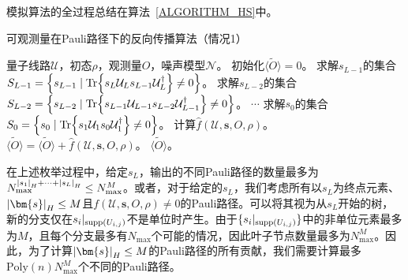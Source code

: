 模拟算法的全过程总结在算法~\ref{ALGORITHM_HS}中。
\begin{algorithm}[H]
    \caption{可观测量在Pauli路径下的反向传播算法（情况1）}
    \label{ALGORITHM_HS}
    \begin{algorithmic}[1]
        \REQUIRE 量子线路$\mathcal{U}$，初态$\rho$，观测量$O$，噪声模型$\mathcal{N}$。
        \STATE 初始化$\widetilde{\langle O \rangle}=0$。
            \STATE 求解$s_{L-1}$的集合$S_{L-1}=\left\{s_{L-1}\mid \Tr{s_L \mathcal{U}_L s_{L-1} \mathcal{U}_L^\dagger}\neq 0\right\}$。
                    \STATE 求解$s_{L-2}$的集合$S_{L-2}=\left\{s_{L-2}\mid \Tr{s_{L-1} \mathcal{U}_{L-1} s_{L-2} \mathcal{U}_{L-1}^\dagger}\neq 0\right\}$。
                            \STATE $\cdots$
                            \STATE 求解$s_{0}$的集合$S_{0}=\left\{s_{0}\mid \Tr{s_{1} \mathcal{U}_{1} s_{0} \mathcal{U}_{1}^\dagger}\neq 0\right\}$。
                                    \STATE 计算$\hat{f}(\mathcal{U},\bm{s},O,\rho)$。
                                    \STATE $\widetilde{\langle O \rangle}=\widetilde{\langle O \rangle}+\hat{f}(\mathcal{U},\bm{s},O,\rho)$。
                                \ENDIF
                            \ENDFOR
                        \ENDIF
                    \ENDFOR
                \ENDIF
            \ENDFOR
        \ENDFOR
        \RETURN $\widetilde{\langle O \rangle}$。
    \end{algorithmic}
\end{algorithm}

在上述枚举过程中，给定$s_L$，输出的不同Pauli路径的数量最多为$N_{\text{max}}^{\abs{s_1}_H+\cdots+\abs{s_L}_H}\leq N_{\text{max}}^{M}$。或者，对于给定的$s_L$，我们考虑所有以$s_L$为终点元素、$\abs{\bm{s}}_H\leq M$且$f(\mathcal{U},\bm{s},O,\rho)\neq 0$的Pauli路径。可以将其视为从$s_L$开始的树，新的分支仅在$s_{i}|_{\text{supp}(U_{i,j})}$不是单位时产生。由于$\{s_{i}|_{\text{supp}(U_{i,j})}\}$中的非单位元素最多为$M$，且每个分支最多有$N_{\text{max}}$个可能的情况，因此叶子节点数量最多为$N_{\text{max}}^{M}$。因此，为了计算$\abs{\bm{s}}_H\leq M$的Pauli路径的所有贡献，我们需要计算最多$\mathrm{Poly}(n) N_{\text{max}}^{M}$个不同的Pauli路径。

